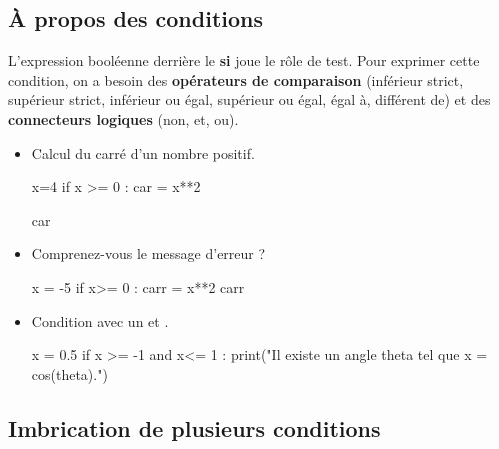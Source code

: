 \subsection{\`A propos des conditions}

L'expression booléenne derrière le \textbf{si} joue le rôle de test. Pour exprimer cette condition, 
on a besoin des \textbf{opérateurs de comparaison} (inférieur strict, supérieur strict, inférieur ou 
égal, supérieur ou égal, égal à, différent de) et des \textbf{connecteurs logiques}
(non, et, ou).


\begin{itemize}

\item Calcul du carré d'un nombre positif. 

\begin{pyconsole}
x=4
if x >= 0 : 
    car = x**2

car
\end{pyconsole}

\item Comprenez-vous le message d'erreur ? 



\begin{pyconsole}
x = -5
if x>= 0 :
    carr  = x**2
carr
\end{pyconsole} 



\item Condition avec un \og et \fg{}. 

\begin{pyconsole}
x = 0.5 
if x >= -1 and x<= 1 :
    print("Il existe un angle theta tel que x = cos(theta).") 

\end{pyconsole}
 \end{itemize}





\subsection{Imbrication de plusieurs conditions}

